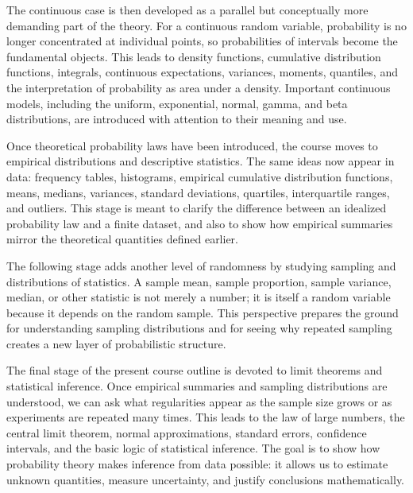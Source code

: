 The continuous case is then developed as a parallel but conceptually more demanding part of the theory. For a continuous random variable, probability is no longer concentrated at individual points, so probabilities of intervals become the fundamental objects. This leads to density functions, cumulative distribution functions, integrals, continuous expectations, variances, moments, quantiles, and the interpretation of probability as area under a density. Important continuous models, including the uniform, exponential, normal, gamma, and beta distributions, are introduced with attention to their meaning and use.

Once theoretical probability laws have been introduced, the course moves to empirical distributions and descriptive statistics. The same ideas now appear in data: frequency tables, histograms, empirical cumulative distribution functions, means, medians, variances, standard deviations, quartiles, interquartile ranges, and outliers. This stage is meant to clarify the difference between an idealized probability law and a finite dataset, and also to show how empirical summaries mirror the theoretical quantities defined earlier.

The following stage adds another level of randomness by studying sampling and distributions of statistics. A sample mean, sample proportion, sample variance, median, or other statistic is not merely a number; it is itself a random variable because it depends on the random sample. This perspective prepares the ground for understanding sampling distributions and for seeing why repeated sampling creates a new layer of probabilistic structure.

The final stage of the present course outline is devoted to limit theorems and statistical inference. Once empirical summaries and sampling distributions are understood, we can ask what regularities appear as the sample size grows or as experiments are repeated many times. This leads to the law of large numbers, the central limit theorem, normal approximations, standard errors, confidence intervals, and the basic logic of statistical inference. The goal is to show how probability theory makes inference from data possible: it allows us to estimate unknown quantities, measure uncertainty, and justify conclusions mathematically.
